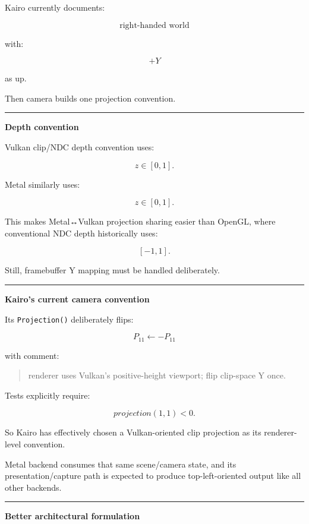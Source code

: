 Kairo currently documents:

\[
\boxed{
\text{right-handed world}
}
\]

with:

\[
+Y
\]

as up.

Then camera builds one projection convention.

\begin{center}\rule{0.5\linewidth}{0.5pt}\end{center}

\textbf{Depth convention}

Vulkan clip/NDC depth convention uses:

\[
z\in[0,1].
\]

Metal similarly uses:

\[
z\in[0,1].
\]

This makes Metal↔Vulkan projection sharing easier than OpenGL, where conventional NDC depth historically uses:

\[
[-1,1].
\]

Still, framebuffer Y mapping must be handled deliberately.

\begin{center}\rule{0.5\linewidth}{0.5pt}\end{center}

\textbf{Kairo's current camera convention}

Its \texttt{Projection()} deliberately flips:

\[
P_{11}
\leftarrow
-P_{11}
\]

with comment:

\begin{quote}
renderer uses Vulkan's positive-height viewport; flip clip-space Y once.
\end{quote}

Tests explicitly require:

\[
projection(1,1)<0.
\]

So Kairo has effectively chosen a Vulkan-oriented clip projection as its renderer-level convention.

Metal backend consumes that same scene/camera state, and its presentation/capture path is expected to produce top-left-oriented output like all other backends.

\begin{center}\rule{0.5\linewidth}{0.5pt}\end{center}

\textbf{Better architectural formulation}

